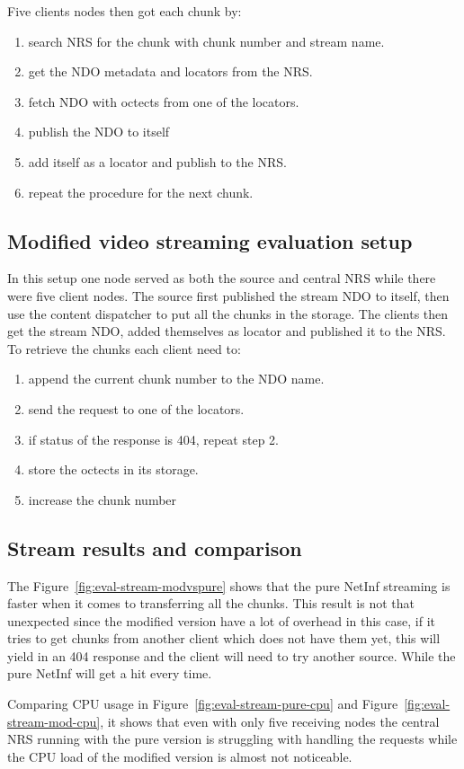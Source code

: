 Five clients nodes then got each chunk by:
\begin{enumerate}
\item search NRS for the chunk with chunk number and stream name.
\item get the NDO metadata and locators from the NRS.
\item fetch NDO with octects from one of the locators.
\item publish the NDO to itself 
\item add itself as a locator and publish to the NRS.
\item repeat the procedure for the next chunk.
\end{enumerate}

\subsection{Modified video streaming evaluation setup}
In this setup one node served as both the source and central NRS while there were five client nodes. The source first published the stream NDO to itself, then use the content dispatcher to put all the chunks in the storage.
The clients then get the stream NDO, added themselves as locator and published it to the NRS. To retrieve the chunks each client need to:
\begin{enumerate}
\item append the current chunk number to the NDO name.
\item send the request to one of the locators.
\item if status of the response is 404, repeat step 2.
\item store the octects in its storage.
\item increase the chunk number
\end{enumerate}

\subsection{Stream results and comparison} 
The Figure~\ref{fig:eval-stream-modvspure} shows that the pure NetInf streaming is faster when it comes to transferring all the chunks. This result is not that unexpected since the modified version have a lot of overhead in this case, if it tries to get chunks from another client which does not have them yet, this will yield in an 404 response and the client will need to try another source. While the pure NetInf will get a hit every time. 
 
Comparing CPU usage in Figure~\ref{fig:eval-stream-pure-cpu} and Figure~\ref{fig:eval-stream-mod-cpu}, it shows that even with only five receiving nodes the central NRS running with the pure version is struggling with handling the requests while the CPU load of the modified version is almost not noticeable.

